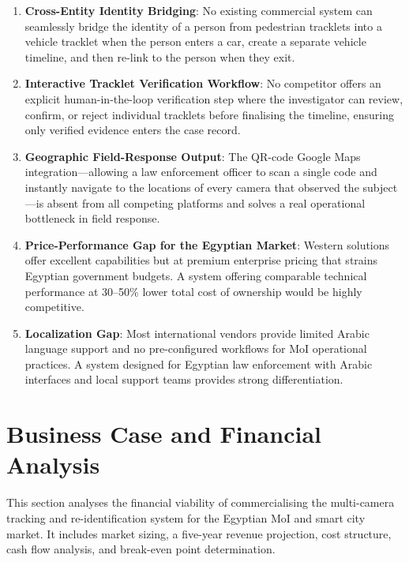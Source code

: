 \begin{enumerate}
    \item \textbf{Cross-Entity Identity Bridging}: No existing commercial system can seamlessly bridge the identity of a person from pedestrian tracklets into a vehicle tracklet when the person enters a car, create a separate vehicle timeline, and then re-link to the person when they exit.
    \item \textbf{Interactive Tracklet Verification Workflow}: No competitor offers an explicit human-in-the-loop verification step where the investigator can review, confirm, or reject individual tracklets before finalising the timeline, ensuring only verified evidence enters the case record.
    \item \textbf{Geographic Field-Response Output}: The QR-code Google Maps integration—allowing a law enforcement officer to scan a single code and instantly navigate to the locations of every camera that observed the subject—is absent from all competing platforms and solves a real operational bottleneck in field response.
    \item \textbf{Price-Performance Gap for the Egyptian Market}: Western solutions offer excellent capabilities but at premium enterprise pricing that strains Egyptian government budgets. A system offering comparable technical performance at 30--50\% lower total cost of ownership would be highly competitive.
    \item \textbf{Localization Gap}: Most international vendors provide limited Arabic language support and no pre-configured workflows for MoI operational practices. A system designed for Egyptian law enforcement with Arabic interfaces and local support teams provides strong differentiation.
\end{enumerate}

\section{Business Case and Financial Analysis}

This section analyses the financial viability of commercialising the multi-camera tracking and re-identification system for the Egyptian MoI and smart city market. It includes market sizing, a five-year revenue projection, cost structure, cash flow analysis, and break-even point determination.

